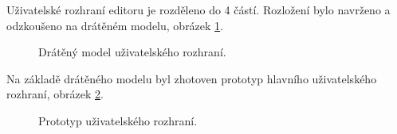 Uživatelské rozhraní editoru je rozděleno do 4 částí. Rozložení bylo navrženo a odzkoušeno na drátěném modelu, obrázek \ref{img:wireframe}.
\begin{figure}[h]
	\centering
	\caption{Drátěný model uživatelského rozhraní.}\label{img:wireframe}
\end{figure}
Na základě drátěného modelu byl zhotoven prototyp hlavního uživatelského rozhraní, obrázek \ref{img:mockup}.
\begin{figure}[!h]
	\centering
	\caption{Prototyp uživatelského rozhraní.}\label{img:mockup}
\end{figure}

